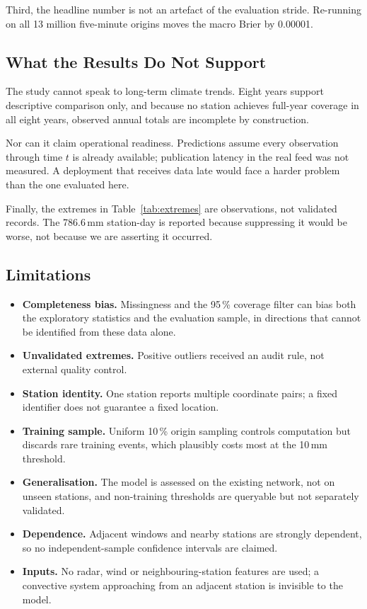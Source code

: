 \documentclass[10pt,a4paper,twocolumn,twoside]{rho-class/rho}
\begin{document}
Third, the headline number is not an artefact of the evaluation stride. Re-running on all 13 million five-minute origins moves the macro Brier by 0.00001.

\subsection{What the Results Do Not Support}
The study cannot speak to long-term climate trends. Eight years support descriptive comparison only, and because no station achieves full-year coverage in all eight years, observed annual totals are incomplete by construction.

Nor can it claim operational readiness. Predictions assume every observation through time $t$ is already available; publication latency in the real feed was not measured. A deployment that receives data late would face a harder problem than the one evaluated here.

Finally, the extremes in Table~\ref{tab:extremes} are observations, not validated records. The 786.6\,mm station-day is reported because suppressing it would be worse, not because we are asserting it occurred.

\subsection{Limitations}
\label{sec:limitations}
\begin{itemize}[topsep=0pt, itemsep=0pt]
\item \textbf{Completeness bias.} Missingness and the 95\,\% coverage filter can bias both the exploratory statistics and the evaluation sample, in directions that cannot be identified from these data alone.
\item \textbf{Unvalidated extremes.} Positive outliers received an audit rule, not external quality control.
\item \textbf{Station identity.} One station reports multiple coordinate pairs; a fixed identifier does not guarantee a fixed location.
\item \textbf{Training sample.} Uniform 10\,\% origin sampling controls computation but discards rare training events, which plausibly costs most at the 10\,mm threshold.
\item \textbf{Generalisation.} The model is assessed on the existing network, not on unseen stations, and non-training thresholds are queryable but not separately validated.
\item \textbf{Dependence.} Adjacent windows and nearby stations are strongly dependent, so no independent-sample confidence intervals are claimed.
\item \textbf{Inputs.} No radar, wind or neighbouring-station features are used; a convective system approaching from an adjacent station is invisible to the model.
\end{itemize}
\end{document}
